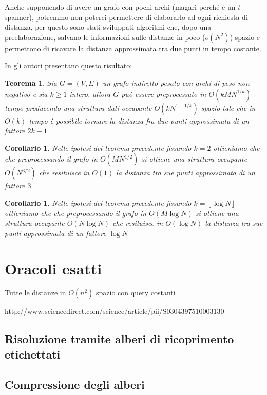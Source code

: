 \documentclass[a4paper,10pt]{amsbook}
\newcounter{counter1}
\theoremstyle{plain}
\newtheorem{myteo}[counter1]{Teorema}
\newtheorem{mycor}[counter1]{Corollario}
\theoremstyle{definition}
\theoremstyle{remark}
\newcommand{\pa}[1]{\left(#1\right)}
\newcommand{\floor}[1]{\left\lfloor#1\right\rfloor}
\begin{document}
Anche supponendo di avere un grafo con pochi archi (magari perch\'e è
un $t$-spanner), potremmo non poterci permettere di elaborarlo ad ogni
richiesta di distanza, per questo sono stati sviluppati algoritmi che,
dopo una preelaborazione, salvano le informazioni sulle distanze in
poco ($o(N^2)$) spazio e permettono di ricavare la distanza
approssimata tra due punti in tempo costante.

In \cite{appdistoracl} gli autori presentano questo risultato:
\begin{myteo}
  Sia $G = (V,E)$ un grafo indiretto pesato con archi di peso non
  negativo e sia $k\ge 1$ intero, allora $G$ pu\`o essere
  preprocessato in $O\pa{kMN^{1/k}}$ tempo producendo una struttura
  dati occupante $O\pa{kN^{1+1/k}}$ spazio tale che in $O\pa{k}$ tempo
  \`e possibile tornare la distanza fra due punti approssimata di un
  fattore $2k-1$
\end{myteo}
\begin{mycor}
  Nelle ipotesi del teorema precedente fissando $k=2$ ottieniamo che
  che preprocessando il grafo in $O\pa{MN^{1/2}}$ si ottiene una
  struttura occupante $O\pa{N^{3/2}}$ che resituisce in $O\pa{1}$ la
  distanza tra sue punti approssimata di un fattore $3$
\end{mycor}
\begin{mycor}
  Nelle ipotesi del teorema precedente fissando $k=\floor{\log N}$ ottieniamo
  che che preprocessando il grafo in $O\pa{M\log N}$ si ottiene una
  struttura occupante $O\pa{N\log{N}}$ che resituisce in $O\pa{\log N}$ la
  distanza tra sue punti approssimata di un fattore $\log N$
\end{mycor}

\section{Oracoli esatti}
\label{sec:oracoliesatti}

Tutte le distanze in $O(n^2)$ spazio con query costanti

http://www.sciencedirect.com/science/article/pii/S0304397510003130

\subsection{Risoluzione tramite alberi di ricoprimento etichettati}

\subsection{Compressione degli alberi}
\end{document}
